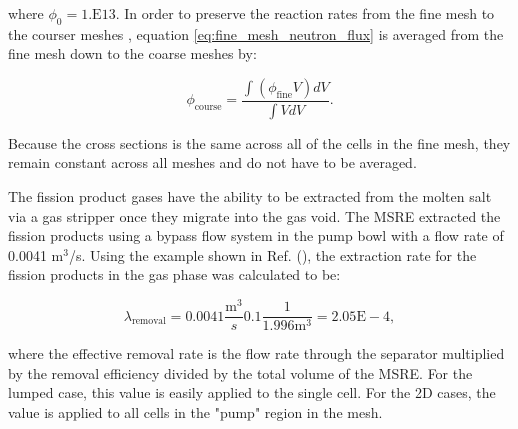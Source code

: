 \noindent where $\phi_{0} = 1.\text{E}13$. In order to preserve the reaction rates from the fine mesh to the courser meshes , equation \ref{eq:fine_mesh_neutron_flux} is averaged from the fine mesh down to the coarse meshes by:

\begin{equation}
	\phi_{\text{course}} = \frac{\int (\phi_{\text{fine}}V)dV}{\int VdV}.
\end{equation}

\noindent Because the cross sections is the same across all of the cells in the fine mesh, they remain constant across all meshes and do not have to be averaged. 

The fission product gases have the ability to be extracted from the molten salt via a gas stripper once they migrate into the gas void. The MSRE extracted the fission products using a bypass flow system in the pump bowl with a flow rate of 0.0041 m$^{3}$/s. Using the example shown in Ref. (\cite{betzler2020}), the extraction rate for the fission products in the gas phase was calculated to be:

\begin{equation}
	\lambda_{\text{removal}} = 0.0041\frac{\text{m}^{3}}{s}0.1\frac{1}{1.996\text{m}^{3}} = 2.05\text{E}-4,
\end{equation}

where the effective removal rate is the flow rate through the separator multiplied by the removal efficiency divided by the total volume of the MSRE. For the lumped case, this value is easily applied to the single cell. For the 2D cases, the value is applied to all cells in the "pump" region in the mesh.   






